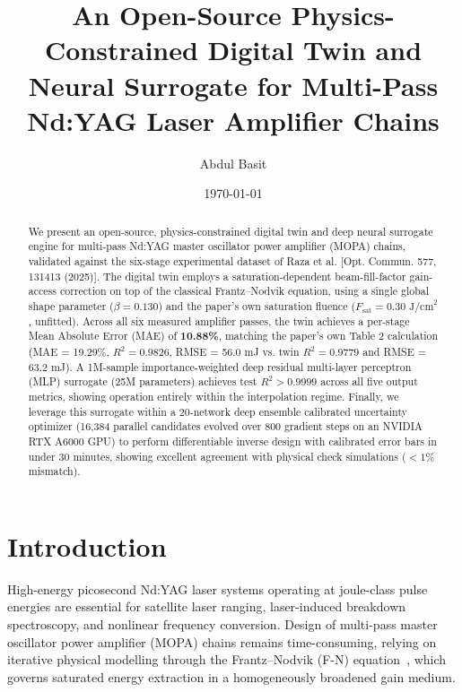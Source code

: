 \documentclass[aps,reprint,twocolumn,amsmath,amssymb,graphicx,nofootinbib]{revtex4-2}
\begin{document}
\title{An Open-Source Physics-Constrained Digital Twin and Neural Surrogate for Multi-Pass Nd:YAG Laser Amplifier Chains}

\author{Abdul Basit}

\date{\today}

\begin{abstract}
We present an open-source, physics-constrained digital twin and deep neural surrogate engine for multi-pass Nd:YAG master oscillator power amplifier (MOPA) chains, validated against the six-stage experimental dataset of Raza et al. [Opt. Commun. 577, 131413 (2025)]. The digital twin employs a saturation-dependent beam-fill-factor gain-access correction on top of the classical Frantz--Nodvik equation, using a single global shape parameter ($\beta = 0.130$) and the paper's own saturation fluence ($F_{\text{sat}} = 0.30\text{ J/cm}^2$, unfitted). Across all six measured amplifier passes, the twin achieves a per-stage Mean Absolute Error (MAE) of \textbf{10.88\%}, matching the paper's own Table 2 calculation (MAE = 19.29\%, $R^2 = 0.9826$, RMSE = 56.0 mJ vs. twin $R^2 = 0.9779$ and RMSE = 63.2 mJ). A 1M-sample importance-weighted deep residual multi-layer perceptron (MLP) surrogate (25M parameters) achieves test $R^2 > 0.9999$ across all five output metrics, showing operation entirely within the interpolation regime. Finally, we leverage this surrogate within a 20-network deep ensemble calibrated uncertainty optimizer (16,384 parallel candidates evolved over 800 gradient steps on an NVIDIA RTX A6000 GPU) to perform differentiable inverse design with calibrated error bars in under 30 minutes, showing excellent agreement with physical check simulations ($<1\%$ mismatch).
\end{abstract}

\maketitle

\section{Introduction}

High-energy picosecond Nd:YAG laser systems operating at joule-class pulse energies are essential for satellite laser ranging, laser-induced breakdown spectroscopy, and nonlinear frequency conversion. Design of multi-pass master oscillator power amplifier (MOPA) chains remains time-consuming, relying on iterative physical modelling through the Frantz--Nodvik (F-N) equation~\cite{frantz1963theory}, which governs saturated energy extraction in a homogeneously broadened gain medium.
\end{document}
